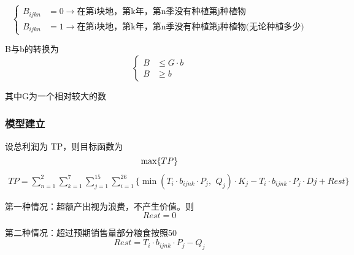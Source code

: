 \documentclass[a4paper]{article}
\begin{document}
		\begin{equation}
			\left\{
			\begin{aligned}
				\nonumber
				B_{ijkn} &= 0 \rightarrow \text{在第i块地，第k年，第n季没有种植第j种植物} \\
				B_{ijkn} &= 1 \rightarrow \text{在第i块地，第k年，第n季没有种植第j种植物(无论种植多少)}
			\end{aligned}
			\right.
		\end{equation}
    	
	
	B与b的转换为
	\begin{equation}
		\left\{
		\begin{aligned}
			\nonumber
			B& \leq G \cdot b \\
			B& \geq b
		\end{aligned}
		\right.
	\end{equation}
	
	其中G为一个相对较大的数
	
	\subsubsection{模型建立}
	
	设总利润为 TP，则目标函数为
	\begin{equation*}
		\max\{TP\} \\
	\end{equation*}	
	\begin{align*}	
		TP =\sum_{n = 1}^{2}\sum_{k = 1}^{7}\sum_{j = 1}^{15} \sum_{i = 1}^{26} \{ \min(T_i \cdot b_{ijnk} \cdot P_j \text{, } \  Q_j) \cdot K_j - T_i \cdot b_{ijnk} \cdot P_j \cdot Dj + Rest\}
	\end{align*}
	
	第一种情况：超额产出视为浪费，不产生价值。则
	\begin{equation*}
		Rest = 0
	\end{equation*}	 \par
	
	第二种情况：超过预期销售量部分粮食按照50%
	\begin{equation*}
		Rest = T_i \cdot b_{ijnk} \cdot P_j - Q_j
	\end{equation*}	
\end{document}
